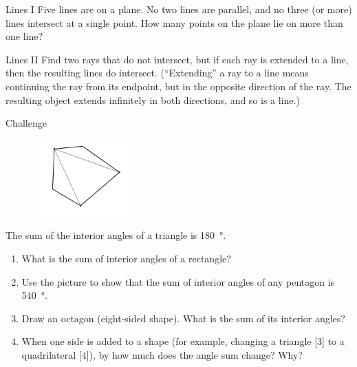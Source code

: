 \documentclass[14pt,letterpaper]{article}
\begin{document}
\begin{problem}{Lines I}
 Five lines are on a plane. No two lines are parallel, and no three (or more)
 lines intersect at a single point. How many points on the plane lie on more
 than one line? 
\end{problem}

\begin{problem}{Lines II}
 Find two rays that do not intersect, but if each ray is extended to a line,
 then the resulting lines do intersect. (``Extending'' a ray to a line means
 continuing the ray from its endpoint, but in the opposite direction of the
 ray. The resulting object extends infinitely in both directions, and so is a
 line.) 
\end{problem}

\begin{problem}{Challenge}

\begin{figure}
 \includegraphics[width=10em]{pentagon.png}
\end{figure}

The sum of the interior angles of a triangle is \SI{180}{\degree}.

\begin{enumerate}
 \item What is the sum of interior angles of a rectangle?
 \item Use the picture to show that the sum of interior angles of any pentagon
 is \SI{540}{\degree}.
 \item Draw an octagon (eight-sided shape). What is the sum of its interior
 angles? 
 \item When one side is added to a shape (for example, changing a triangle
 [$3$] to a quadrilateral [$4$]), by how much does the angle sum change? Why?
\end{enumerate}

\end{problem}
\end{document}
